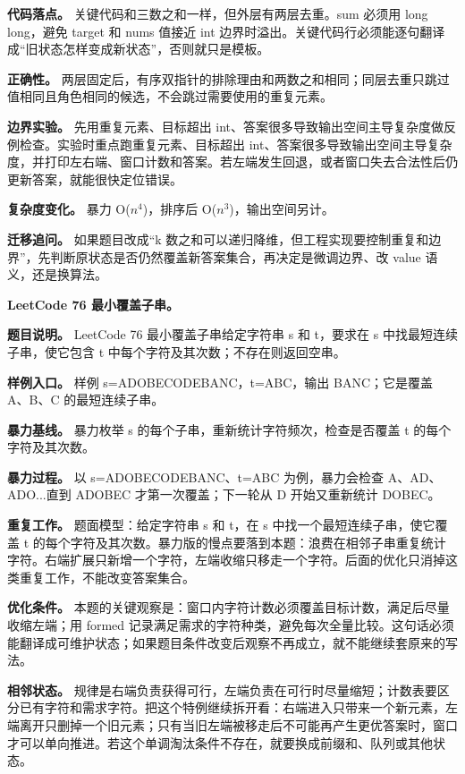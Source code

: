 \textbf{代码落点。} 关键代码和三数之和一样，但外层有两层去重。sum 必须用 long long，避免 target 和 nums 值接近 int 边界时溢出。关键代码行必须能逐句翻译成“旧状态怎样变成新状态”，否则就只是模板。

\textbf{正确性。} 两层固定后，有序双指针的排除理由和两数之和相同；同层去重只跳过值相同且角色相同的候选，不会跳过需要使用的重复元素。

\textbf{边界实验。} 先用重复元素、目标超出 int、答案很多导致输出空间主导复杂度做反例检查。实验时重点跑重复元素、目标超出 int、答案很多导致输出空间主导复杂度，并打印左右端、窗口计数和答案。若左端发生回退，或者窗口失去合法性后仍更新答案，就能很快定位错误。

\textbf{复杂度变化。} 暴力 O(\ensuremath{n^{4}})，排序后 O(\ensuremath{n^{3}})，输出空间另计。

\textbf{迁移追问。} 如果题目改成“k 数之和可以递归降维，但工程实现要控制重复和边界”，先判断原状态是否仍然覆盖新答案集合，再决定是微调边界、改 value 语义，还是换算法。

\noindent\textbf{LeetCode 76 最小覆盖子串。}

\textbf{题目说明。} LeetCode 76 最小覆盖子串给定字符串 s 和 t，要求在 s 中找最短连续子串，使它包含 t 中每个字符及其次数；不存在则返回空串。

\textbf{样例入口。} 样例 s=ADOBECODEBANC，t=ABC，输出 BANC；它是覆盖 A、B、C 的最短连续子串。

\textbf{暴力基线。} 暴力枚举 s 的每个子串，重新统计字符频次，检查是否覆盖 t 的每个字符及其次数。

\textbf{暴力过程。} 以 s=ADOBECODEBANC、t=ABC 为例，暴力会检查 A、AD、ADO...直到 ADOBEC 才第一次覆盖；下一轮从 D 开始又重新统计 DOBEC。

\textbf{重复工作。} 题面模型：给定字符串 s 和 t，在 s 中找一个最短连续子串，使它覆盖 t 的每个字符及其次数。暴力版的慢点要落到本题：浪费在相邻子串重复统计字符。右端扩展只新增一个字符，左端收缩只移走一个字符。后面的优化只消掉这类重复工作，不能改变答案集合。

\textbf{优化条件。} 本题的关键观察是：窗口内字符计数必须覆盖目标计数，满足后尽量收缩左端；用 formed 记录满足需求的字符种类，避免每次全量比较。这句话必须能翻译成可维护状态；如果题目条件改变后观察不再成立，就不能继续套原来的写法。

\textbf{相邻状态。} 规律是右端负责获得可行，左端负责在可行时尽量缩短；计数表要区分已有字符和需求字符。把这个特例继续拆开看：右端进入只带来一个新元素，左端离开只删掉一个旧元素；只有当旧左端被移走后不可能再产生更优答案时，窗口才可以单向推进。若这个单调淘汰条件不存在，就要换成前缀和、队列或其他状态。

